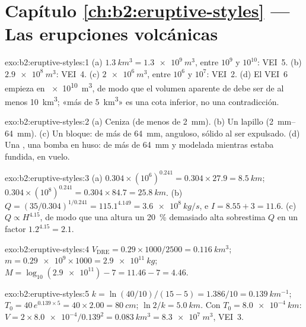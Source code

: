 \section*{Capítulo \ref{ch:b2:eruptive-styles} --- Las erupciones volcánicas}

\begin{solution}{exo:b2:eruptive-styles:1}
(a) $\qty{1.3}{km^3} = \qty{1.3e9}{m^3}$, entre $10^9$ y $10^{10}$: VEI~5.
(b) $\qty{2.9e8}{m^3}$: VEI~4. (c) $\qty{2e6}{m^3}$, entre $10^6$ y $10^7$:
VEI~2. (d) El VEI~6 empieza en \qty{e10}{m^3}, de modo que el volumen aparente de  debe ser de al menos
\qty{10}{km^3}; «más de \qty{5}{km^3}» es una cota inferior, no una contradicción.
\end{solution}

\begin{solution}{exo:b2:eruptive-styles:2}
(a) Ceniza (de menos de \qty{2}{mm}). (b) Un lapillo (\qtyrange{2}{64}{mm}).
(c) Un bloque: de más de \qty{64}{mm}, anguloso, sólido al ser expulsado. (d) Una
, una bomba en huso: de más de \qty{64}{mm} y modelada mientras estaba fundida,
en vuelo.
\end{solution}

\begin{solution}{exo:b2:eruptive-styles:3}
(a) $0.304\times(10^6)^{0.241} = 0.304\times27.9 = \qty{8.5}{km}$;
$0.304\times(10^8)^{0.241} = 0.304\times84.7 = \qty{25.8}{km}$.
(b) $Q = (35/0.304)^{1/0.241} = 115.1^{4.149} = \qty{3.6e8}{kg/s}$, e $I =
8.55 + 3 = 11.6$. (c) $Q \propto H^{4.15}$, de modo que una altura un \qty{20}{\percent} demasiado alta
sobrestima $Q$ en un factor $1.2^{4.15} = 2.1$.
\end{solution}

\begin{solution}{exo:b2:eruptive-styles:4}
$V_{\mathrm{DRE}} = 0.29\times1000/2500 = \qty{0.116}{km^3}$; $m =
\num{0.29e9}\times1000 = \qty{2.9e11}{kg}$; $M = \log_{10}(\num{2.9e11}) - 7 = 11.46
- 7 = 4.46$.
\end{solution}

\begin{solution}{exo:b2:eruptive-styles:5}
$k = \ln(40/10)/(15 - 5) = 1.386/10 = \qty{0.139}{km^{-1}}$; $T_0 = 40\,e^{0.139\times5}
= 40\times2.00 = \qty{80}{cm}$; $\ln2/k = \qty{5.0}{km}$. Con $T_0 =
\qty{8.0e-4}{km}$: $V = 2\times\num{8.0e-4}/0.139^2 = \qty{0.083}{km^3} =
\qty{8.3e7}{m^3}$, VEI~3.
\end{solution}

